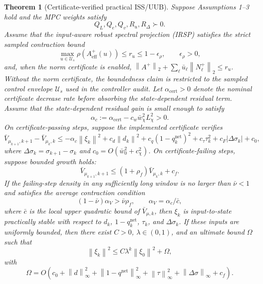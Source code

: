 \documentclass[twocolumn,3p,times,procedia]{elsarticle}
\newcommand{\norm}[1]{\left\lVert #1 \right\rVert}
\newtheorem{theorem}{Theorem}
\begin{document}
\begin{theorem}[Certificate-verified practical ISS/UUB]
\label{thm:practical_iss_uub}
Suppose Assumptions 1--3 hold and the MPC weights satisfy
\begin{equation}
Q_L,Q_e,Q_v,R_u,R_\Delta\succ0 .
\label{eq:positive_weights}
\end{equation}
Assume that the input-aware robust spectral projection (IRSP) satisfies the strict sampled contraction bound
\begin{equation}
\max_{u\in\mathcal U_s}\rho(A_{\mathrm{eff}}^+(u))\le r_u\le 1-\epsilon_\rho,\qquad \epsilon_\rho>0,
\label{eq:irsp_strict_contraction}
\end{equation}
and, when the norm certificate is enabled,
$\norm{A^+}_2+\sum_\ell \bar u_\ell\norm{N_\ell^+}_2\le r_u$. Without the norm certificate, the boundedness claim is restricted to the sampled control envelope $\mathcal U_s$ used in the controller audit. Let $\alpha_{\mathrm{cert}}>0$ denote the nominal certificate decrease rate before absorbing the state-dependent residual term. Assume that the state-dependent residual gain is small enough to satisfy
\begin{equation}
\alpha_c:=\alpha_{\mathrm{cert}}-c_w\bar w_\chi^2L_\chi^2>0 .
\label{eq:residual_small_gain}
\end{equation}
On certificate-passing steps, suppose the implemented certificate verifies
\begin{equation}
\bar V_{\mu_{k+1},k+1}-\bar V_{\mu_k,k}
\le -\alpha_c\norm{\xi_k}^2
+c_d\norm{d_k}^2+c_q(1-q_k^{\mathrm{net}})^2
+c_\tau\tau_k^2+c_F|\Delta\sigma_k|+c_0 ,
\label{eq:iss_difference}
\end{equation}
where $\Delta\sigma_k=\sigma_{k+1}-\sigma_k$ and $c_0=O(\bar w_0^2+c_\chi^2)$. On certificate-failing steps, suppose bounded growth holds:
\begin{equation}
\bar V_{\mu_{k+1},k+1}\le (1+\rho_f)\bar V_{\mu_k,k}+c_f .
\label{eq:failure_growth_bound}
\end{equation}
If the failing-step density in any sufficiently long window is no larger than $\bar\nu<1$ and satisfies the average contraction condition
\begin{equation}
(1-\bar\nu)\alpha_V>\bar\nu\rho_f,
\qquad
\alpha_V=\alpha_c/\bar c ,
\label{eq:average_contraction_condition}
\end{equation}
where $\bar c$ is the local upper quadratic bound of $\bar V_{\mu,k}$, then $\xi_k$ is input-to-state practically stable with respect to $d_k$, $1-q_k^{\mathrm{net}}$, $\tau_k$, and $\Delta\sigma_k$. If these inputs are uniformly bounded, then there exist $C>0$, $\lambda\in(0,1)$, and an ultimate bound $\Omega$ such that
\begin{equation}
\norm{\xi_k}^2\le C\lambda^k\norm{\xi_0}^2+\Omega ,
\label{eq:uub_bound}
\end{equation}
with
\begin{equation}
\Omega=O\!\left(
c_0+\norm{d}_{\infty}^2+\norm{1-q^{\mathrm{net}}}_{\infty}^2
+\norm{\tau}_{\infty}^2+\norm{\Delta\sigma}_{\infty}+c_f
\right).
\label{eq:uub_bound_terms}
\end{equation}
\end{theorem}
\end{document}
